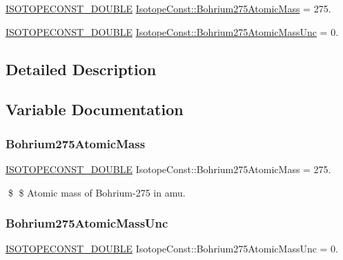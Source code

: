\begin{DoxyCompactItemize}
\item 
\mbox{\hyperlink{group___isotope_const-_macros_ga8f45a7272ce02c0b4c65c44636ed719a}{I\+S\+O\+T\+O\+P\+E\+C\+O\+N\+S\+T\+\_\+\+D\+O\+U\+B\+LE}} \mbox{\hyperlink{group___isotope_const-_bohrium-_bh275_ga53d2b96c7786cf01c2e0add1263abdf2}{Isotope\+Const\+::\+Bohrium275\+Atomic\+Mass}} = 275.
\item 
\mbox{\hyperlink{group___isotope_const-_macros_ga8f45a7272ce02c0b4c65c44636ed719a}{I\+S\+O\+T\+O\+P\+E\+C\+O\+N\+S\+T\+\_\+\+D\+O\+U\+B\+LE}} \mbox{\hyperlink{group___isotope_const-_bohrium-_bh275_ga22a0d58fec881a9f05a1ef182fa67ced}{Isotope\+Const\+::\+Bohrium275\+Atomic\+Mass\+Unc}} = 0.
\end{DoxyCompactItemize}


\subsection{Detailed Description}


\subsection{Variable Documentation}
\mbox{\label{group___isotope_const-_bohrium-_bh275_ga53d2b96c7786cf01c2e0add1263abdf2}} 
\subsubsection{\texorpdfstring{Bohrium275\+Atomic\+Mass}{Bohrium275AtomicMass}}
{\footnotesize\ttfamily \mbox{\hyperlink{group___isotope_const-_macros_ga8f45a7272ce02c0b4c65c44636ed719a}{I\+S\+O\+T\+O\+P\+E\+C\+O\+N\+S\+T\+\_\+\+D\+O\+U\+B\+LE}} Isotope\+Const\+::\+Bohrium275\+Atomic\+Mass = 275.}

\$ \$ Atomic mass of Bohrium-\/275 in amu. \mbox{\label{group___isotope_const-_bohrium-_bh275_ga22a0d58fec881a9f05a1ef182fa67ced}} 
\subsubsection{\texorpdfstring{Bohrium275\+Atomic\+Mass\+Unc}{Bohrium275AtomicMassUnc}}
{\footnotesize\ttfamily \mbox{\hyperlink{group___isotope_const-_macros_ga8f45a7272ce02c0b4c65c44636ed719a}{I\+S\+O\+T\+O\+P\+E\+C\+O\+N\+S\+T\+\_\+\+D\+O\+U\+B\+LE}} Isotope\+Const\+::\+Bohrium275\+Atomic\+Mass\+Unc = 0.}

